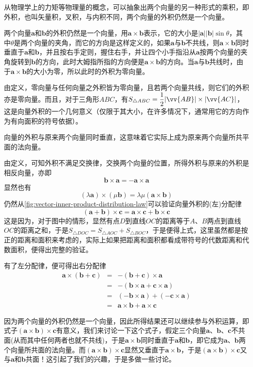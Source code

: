 从物理学上的力矩等物理量的概念，可以抽象出两个向量的另一种形式的乘积，即外积，也叫矢量积，叉积，与内积不同，两个向量的外积仍然是一个向量。

\begin{definition}
  两个向量$\bm{a}$和$\bm{b}$的外积仍然是一个向量，用$\bm{a}\times\bm{b}$表示，它的大小是$|\bm{a}||\bm{b}|\sin{\theta}$，其中$\theta$是两个向量的夹角，而它的方向是这样定义的，如果$\bm{a}$与$\bm{b}$不共线，则$\bm{a}\times\bm{b}$同时垂直于$\bm{a}$和$\bm{b}$，并且按右手定则，握住右手，并让四个小手指沿从$\bm{a}$按两个向量的夹角旋转到$\bm{b}$的方向，此时大姆指所指的方向便是$\bm{a}\times\bm{b}$的方向。当$\bm{a}$与$\bm{b}$共线时，由于$\bm{a}\times\bm{b}$的大小为零，所以此时的外积为零向量。
\end{definition}

由定义，零向量与任何向量之外积皆为零向量，且若两个向量共线，则它们的外积亦是零向量。而且，对于三角形$ABC$，有$S_{\triangle ABC} = \dfrac{1}{2}|\vv{AB}|\times|\vv{AC}|$，这是向量外积的一个几何意义（仅限于其大小，在许多情况下，通常用它的方向作为有向面积的符号依据）。

向量的外积与原来两个向量同时垂直，这意味着它实际上成为原来两个向量所共平面的法向量。

由定义，可知外积不满足交换律，交换两个向量的位置，所得外积与原来的外积是相反向量，亦即
\[ \bm{b} \times \bm{a} = - \bm{a} \times \bm{a} \]
显然也有
\[ (\lambda \bm{a}) \times (\mu \bm{b}) = \lambda \mu (\bm{a}\times\bm{b}) \]
仍然从\autoref{fig:vector-inner-product-distribution-law}可以验证向量外积的(左)分配律
\[ (\bm{a}+\bm{b}) \times \bm{c} = \bm{a} \times \bm{c} + \bm{b} \times \bm{c} \]
这是因为，对于图中的情形，显然有点$D$到直线$OC$的距离等于$A$、$B$两点到直线$OC$的距离之和，于是$S_{\triangle DOC} = S_{\triangle AOC} + S_{\triangle BOC}$，于是便得上式，这里虽然都是按正的距离和面积来考虑的，实际上如果把距离和面积都看成带符号的代数距离和代数面积，便得出完整的验证。

有了左分配律，便可得出右分配律
\begin{eqnarray*}
  \bm{a} \times (\bm{b} + \bm{c}) & = & - (\bm{b} + \bm{c}) \times \bm{a} \\
                                  & = & - (\bm{b} \times \bm{a} + \bm{c} \times \bm{a}) \\
                                  & = & (-\bm{b}\times\bm{a}) + (-\bm{c}\times\bm{a}) \\
  & = & \bm{a}\times\bm{b} + \bm{a}\times\bm{c}
\end{eqnarray*}

因为两个向量的外积仍然是一个向量，因此所得结果还可以继续参与外积运算，即式子$(\bm{a}\times\bm{b})\times\bm{c}$有意义，我们来讨论一下这个式子，假定三个向量$\bm{a}$、$\bm{b}$、$\bm{c}$不共面(从而其中任何两者也就不共线)，于是$\bm{a}\times\bm{b}$同时垂直于$\bm{a}$和$\bm{b}$，即它成为$\bm{a}$、$\bm{b}$两个向量所共面的法向量。而$(\bm{a}\times\bm{b})\times\bm{c}$显然又垂直于$\bm{a}\times\bm{b}$，于是$(\bm{a}\times\bm{b})\times\bm{c}$又与$\bm{a}$和$\bm{b}$共面！这引起了我们的兴趣，于是多做一些讨论。

